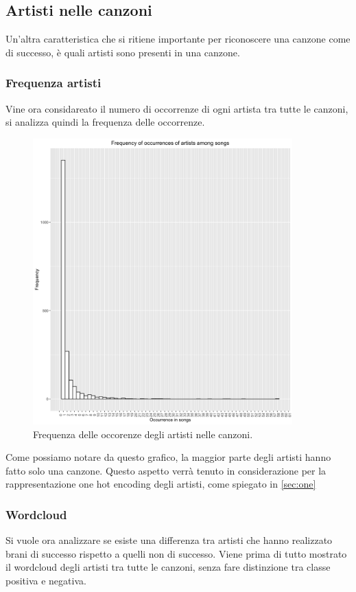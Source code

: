 \subsection{Artisti nelle canzoni}
Un'altra caratteristica che si ritiene importante per riconoscere una
canzone come di successo, è quali artisti sono presenti in una
canzone.

\subsubsection{Frequenza artisti}
\label{sec:freq_artisti}
Vine ora considareato il numero di occorrenze di ogni artista tra
tutte le canzoni, si analizza quindi la frequenza delle occorrenze.

\begin{figure}[H]
	\centering
	\includegraphics[width=10cm]{../images/artists_occurence.png}
	\caption{Frequenza delle occorenze degli artisti nelle canzoni.}
\end{figure}

Come possiamo notare da questo grafico, la maggior parte degli artisti
hanno fatto solo una canzone. Questo aspetto verrà tenuto in
considerazione per la rappresentazione one hot encoding degli artisti,
come spiegato in \autoref{sec:one}

\subsubsection{Wordcloud}
Si vuole ora analizzare se esiste una differenza tra artisti che hanno
realizzato brani di successo rispetto a quelli non di successo. Viene
prima di tutto mostrato il wordcloud degli artisti tra tutte le
canzoni, senza fare distinzione tra classe positiva e negativa.

